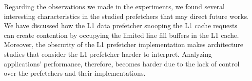 \documentclass[AMA,final,STIX1COL]{WileyNJD-v2}
\begin{document}
Regarding the observations we made in the experiments, we found several interesting characteristics in the studied prefetchers that may direct future works.
We have discussed how the L1 data prefetcher snooping the L1 cache requests can create contention by occupying the limited line fill buffers in the L1 cache.
Moreover, the obscurity of the L1 prefetcher implementation makes architecture studies that consider the L1 prefetcher harder to interpret.
Analyzing applications' performance, therefore, becomes harder due to the lack of control over the prefetchers and their implementations.
\end{document}
